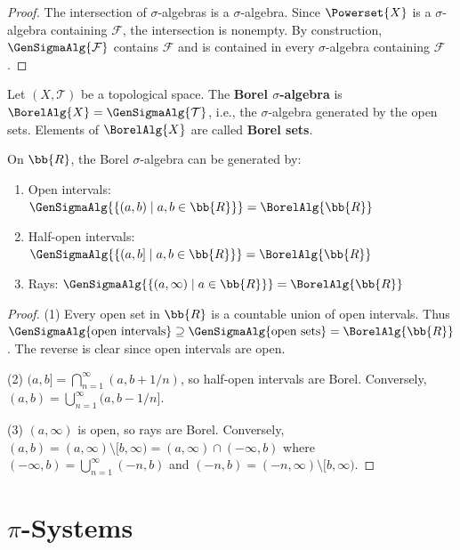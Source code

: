 \begin{proof}
The intersection of $\sigma$-algebras is a $\sigma$-algebra. Since $\Powerset{X}$ is a $\sigma$-algebra containing $\mathcal{F}$, the intersection is nonempty. By construction, $\GenSigmaAlg{\mathcal{F}}$ contains $\mathcal{F}$ and is contained in every $\sigma$-algebra containing $\mathcal{F}$.
\end{proof}

\begin{definition}
Let $(X, \mathcal{T})$ be a topological space. The \textbf{Borel $\sigma$-algebra} is $\BorelAlg{X} = \GenSigmaAlg{\mathcal{T}}$, i.e., the $\sigma$-algebra generated by the open sets. Elements of $\BorelAlg{X}$ are called \textbf{Borel sets}.
\end{definition}

\begin{proposition}
On $\bb{R}$, the Borel $\sigma$-algebra can be generated by:
\begin{enumerate}
    \item Open intervals: $\GenSigmaAlg{\{(a, b) \mid a, b \in \bb{R}\}} = \BorelAlg{\bb{R}}$
    \item Half-open intervals: $\GenSigmaAlg{\{(a, b] \mid a, b \in \bb{R}\}} = \BorelAlg{\bb{R}}$
    \item Rays: $\GenSigmaAlg{\{(a, \infty) \mid a \in \bb{R}\}} = \BorelAlg{\bb{R}}$
\end{enumerate}
\end{proposition}

\begin{proof}
(1) Every open set in $\bb{R}$ is a countable union of open intervals. Thus $\GenSigmaAlg{\text{open intervals}} \supseteq \GenSigmaAlg{\text{open sets}} = \BorelAlg{\bb{R}}$. The reverse is clear since open intervals are open.

(2) $(a, b] = \bigcap_{n=1}^\infty (a, b + 1/n)$, so half-open intervals are Borel. Conversely, $(a, b) = \bigcup_{n=1}^\infty (a, b - 1/n]$.

(3) $(a, \infty)$ is open, so rays are Borel. Conversely, $(a, b) = (a, \infty) \setminus [b, \infty) = (a, \infty) \cap (-\infty, b)$ where $(-\infty, b) = \bigcup_{n=1}^\infty (-n, b)$ and $(-n, b) = (-n, \infty) \setminus [b, \infty)$.
\end{proof}

\section{$\pi$-Systems}

